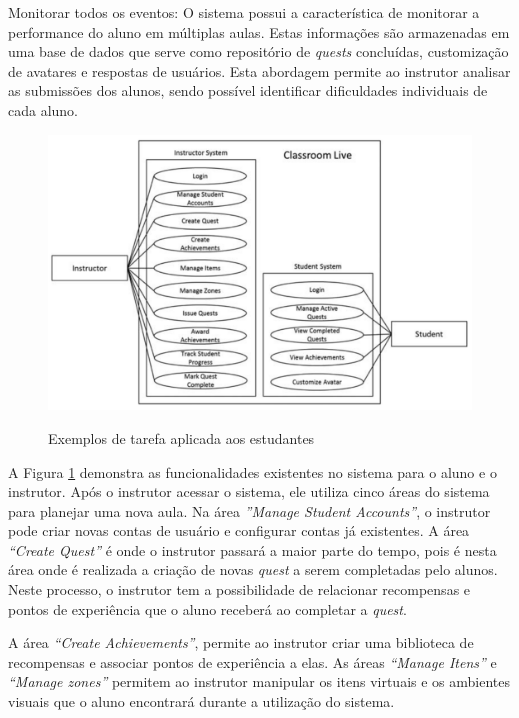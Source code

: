 \documentclass[
	12pt,				%
	oneside,			%
	a4paper,			%
	english,			%
	french,				%
	spanish,			%
	brazil,				%
	]{abntex2}
\begin{document}
Monitorar todos os eventos: O sistema possui a característica de monitorar a performance do aluno em múltiplas aulas. Estas informações são armazenadas em uma base de dados que serve como repositório de \textit{quests} concluídas, customização de avatares e respostas de usuários. Esta abordagem permite ao instrutor analisar as submissões dos alunos, sendo possível identificar dificuldades individuais de cada aluno. 

\begin{figure}[ht]
\centering
\caption{Exemplos de tarefa aplicada aos estudantes}
\includegraphics[width=1\textwidth]{imagens/classroom_diagrama.png}
\label{fig:classroom_diagrama}
\end{figure}

A Figura \ref{fig:classroom_diagrama} demonstra as funcionalidades existentes no sistema para o aluno e o instrutor. Após o instrutor acessar o sistema, ele utiliza cinco áreas do sistema para planejar uma nova aula. Na área \textit{”Manage Student Accounts”}, o instrutor pode criar novas contas de usuário e configurar contas já existentes. A área \textit{“Create Quest”} é onde o instrutor passará a maior parte do tempo, pois é nesta área onde é realizada a criação de novas \textit{quest} a serem completadas pelo alunos. Neste processo, o instrutor tem a possibilidade de relacionar recompensas e pontos de experiência que o aluno receberá ao completar a \textit{quest}. 

A área \textit{“Create Achievements”}, permite ao instrutor criar uma biblioteca de recompensas e associar pontos de experiência a elas. As áreas \textit{“Manage Itens”} e \textit{“Manage zones”} permitem ao instrutor manipular os itens virtuais e os ambientes visuais que o aluno encontrará durante a utilização do sistema.
\end{document}
